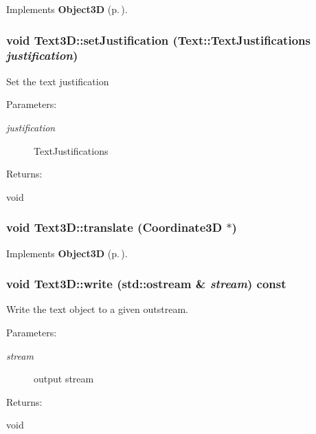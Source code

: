 Implements {\bf Object3D} {\rm (p.\,\pageref{classObject3D_a1})}.
\subsubsection{\setlength{\rightskip}{0pt plus 5cm}void Text3D::set\-Justification ({\bf Text::Text\-Justifications} {\em justification})\hspace{0.3cm}{\tt  [inline]}}\label{classText3D_a3}


Set the text justification \begin{Desc}
\item[Parameters: ]\par
\begin{description}
\item[{\em 
justification}]Text\-Justifications \end{description}
\end{Desc}
\begin{Desc}
\item[Returns: ]\par
void \end{Desc}
\subsubsection{\setlength{\rightskip}{0pt plus 5cm}void Text3D::translate ({\bf Coordinate3D} $\ast$)\hspace{0.3cm}{\tt  [virtual]}}\label{classText3D_a8}




Implements {\bf Object3D} {\rm (p.\,\pageref{classObject3D_a3})}.
\subsubsection{\setlength{\rightskip}{0pt plus 5cm}void Text3D::write (std::ostream \& {\em stream}) const\hspace{0.3cm}{\tt  [virtual]}}\label{classText3D_a9}


Write the text object to a given outstream. \begin{Desc}
\item[Parameters: ]\par
\begin{description}
\item[{\em 
stream}]output stream \end{description}
\end{Desc}
\begin{Desc}
\item[Returns: ]\par
void \end{Desc}


